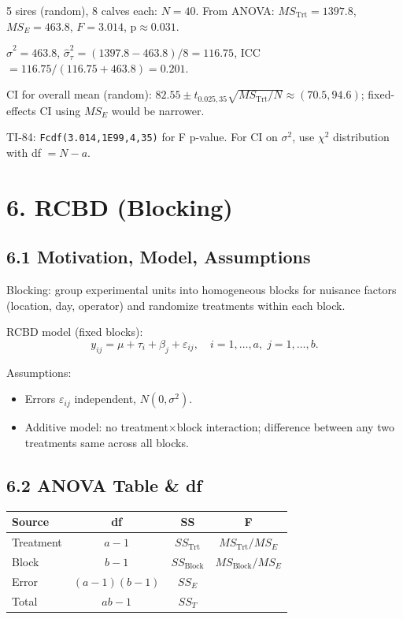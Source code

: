 \documentclass[9pt,letterpaper]{article}
\begin{document}
5 sires (random), 8 calves each: $N=40$. From ANOVA: $MS_{\text{Trt}}=1397.8$, $MS_E=463.8$, $F=3.014$, p$\approx0.031$.

$\hat{\sigma}^2=463.8$, $\hat{\sigma}_\tau^2=(1397.8-463.8)/8=116.75$, ICC $=116.75/(116.75+463.8)=0.201$.

CI for overall mean (random): $82.55\pm t_{0.025,35}\sqrt{MS_{\text{Trt}}/N}\approx(70.5,94.6)$; fixed-effects CI using $MS_E$ would be narrower.

\begin{calcbox}
TI-84: \texttt{Fcdf(3.014,1E99,4,35)} for F p-value. For CI on $\sigma^2$, use $\chi^2$ distribution with df $=N-a$.
\end{calcbox}

\section{6. RCBD (Blocking)}

\subsection{6.1 Motivation, Model, Assumptions}

Blocking: group experimental units into homogeneous blocks for nuisance factors (location, day, operator) and randomize treatments within each block.

RCBD model (fixed blocks):
\[
y_{ij}=\mu+\tau_i+\beta_j+\varepsilon_{ij},\quad i=1,\ldots,a,\; j=1,\ldots,b.
\]

Assumptions:
\begin{itemize}
    \item Errors $\varepsilon_{ij}$ independent, $N(0,\sigma^2)$.
    \item Additive model: no treatment$\times$block interaction; difference between any two treatments same across all blocks.
\end{itemize}

\subsection{6.2 ANOVA Table \& df}

\begin{center}\small
\begin{tabular}{@{}lccc@{}}
\toprule
Source & df & SS & F \\
\midrule
Treatment & $a-1$ & $SS_{\text{Trt}}$ & $MS_{\text{Trt}}/MS_E$ \\
Block & $b-1$ & $SS_{\text{Block}}$ & $MS_{\text{Block}}/MS_E$ \\
Error & $(a-1)(b-1)$ & $SS_E$ & \\
Total & $ab-1$ & $SS_T$ & \\
\bottomrule
\end{tabular}
\end{center}
\end{document}
